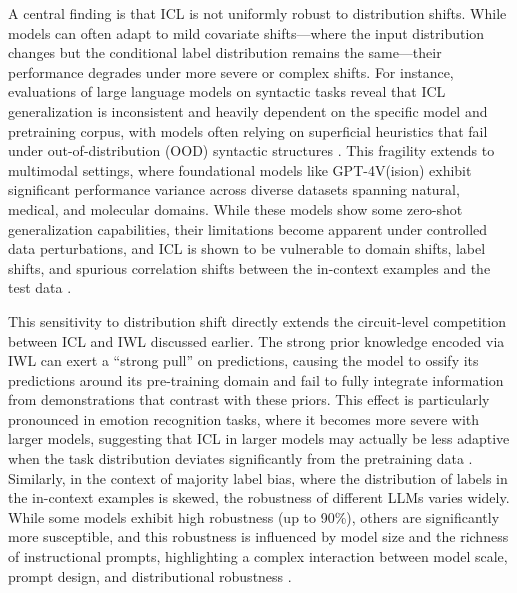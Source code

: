 \documentclass[11pt]{article}
\begin{document}
A central finding is that ICL is not uniformly robust to distribution shifts. While models can often adapt to mild covariate shifts---where the input distribution changes but the conditional label distribution remains the same---their performance degrades under more severe or complex shifts. For instance, evaluations of large language models on syntactic tasks reveal that ICL generalization is inconsistent and heavily dependent on the specific model and pretraining corpus, with models often relying on superficial heuristics that fail under out-of-distribution (OOD) syntactic structures \cite{ref112}. This fragility extends to multimodal settings, where foundational models like GPT-4V(ision) exhibit significant performance variance across diverse datasets spanning natural, medical, and molecular domains. While these models show some zero-shot generalization capabilities, their limitations become apparent under controlled data perturbations, and ICL is shown to be vulnerable to domain shifts, label shifts, and spurious correlation shifts between the in-context examples and the test data \cite{ref113,ref114}.

This sensitivity to distribution shift directly extends the circuit-level competition between ICL and IWL discussed earlier. The strong prior knowledge encoded via IWL can exert a ``strong pull'' on predictions, causing the model to ossify its predictions around its pre-training domain and fail to fully integrate information from demonstrations that contrast with these priors. This effect is particularly pronounced in emotion recognition tasks, where it becomes more severe with larger models, suggesting that ICL in larger models may actually be less adaptive when the task distribution deviates significantly from the pretraining data \cite{ref29}. Similarly, in the context of majority label bias, where the distribution of labels in the in-context examples is skewed, the robustness of different LLMs varies widely. While some models exhibit high robustness (up to 90\%), others are significantly more susceptible, and this robustness is influenced by model size and the richness of instructional prompts, highlighting a complex interaction between model scale, prompt design, and distributional robustness \cite{ref40}.
\end{document}
